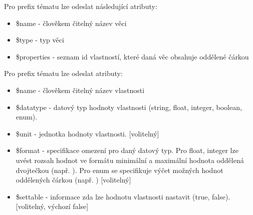 Pro prefix tématu  lze odeslat následující atributy:
\begin{itemize}
    \item \$name - člověkem čitelný název věci
    \item \$type - typ věci
    \item \$properties - seznam id vlastností, které daná věc obsahuje oddělené čárkou
\end{itemize}

Pro prefix tématu  lze odeslat atributy:
\begin{itemize}
    \item \$name - člověkem čitelný název vlastnosti
    \item \$datatype - datový typ hodnoty vlastnosti (string, float, integer, boolean, enum).
    \item \$unit - jednotka hodnoty vlastnosti. [volitelný]
    \item \$format - specifikace omezení pro daný datový typ. Pro float, integer lze uvést rozsah hodnot ve formátu minimální a maximální hodnota oddělená dvojtečkou (např. ). Pro enum se specifikuje výčet možných hodnot oddělených čárkou (např. ) [volitelný]
    \item \$settable - informace zda lze hodnotu vlastnosti nastavit (true, false). [volitelný, výchozí false]
\end{itemize}



